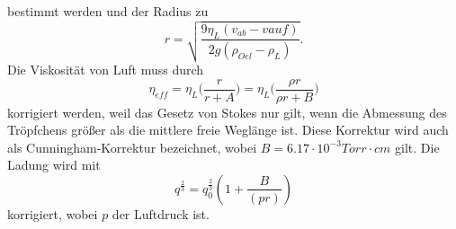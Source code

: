 bestimmt werden und der Radius zu
\begin{equation}
    r = \sqrt{\frac{9 \eta_L (v_{ab}-v{auf})}{2 g (\rho_{Oel}-\rho_L)}}.
    \label{eqn:Radius}
\end{equation}
Die Viskosität von Luft muss durch 
\begin{equation}
    \eta_{eff} = \eta_L \Biggl(\frac{r}{r + A}\Biggr) = \eta_L \Biggl(\frac{\rho r}{\rho r + B}\Biggr)
    \label{eqn:eta_kor}
\end{equation}
korrigiert werden, weil das Gesetz von Stokes nur gilt, wenn die Abmessung des Tröpfchens größer als die mittlere
freie Weglänge ist. Diese Korrektur wird auch als Cunningham-Korrektur bezeichnet, wobei $B = 6.17 \cdot 10^{-3} Torr \cdot cm$ gilt.
Die Ladung wird mit 
\begin{equation}
    q^{\frac{2}{3}} = q^{\frac{2}{3}}_0 (1 + \frac{B}{(p r)})
    \label{eqn:Ladung_kor}
\end{equation}
korrigiert, wobei $p$ der Luftdruck ist.